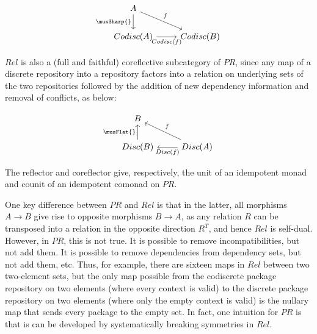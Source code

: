 \documentclass[hoptionsi,review,screen,format=sigconf]{acmart}
\theoremstyle{definition}
\newcommand{\PRb}{\mathit{PR}}
\newcommand{\Relb}{\mathit{Rel}}
\begin{document}
\begin{equation*}
\begin{tikzcd}
A \arrow[rd, "f"] \arrow[d,"\musSharp{}"']      &           \\
Codisc(A) \arrow[r, "Codisc(f)"'] & Codisc(B)
\end{tikzcd}
\end{equation*}

 \(\Relb\) is also a (full and faithful) coreflective subcategory of \(\PRb\), since any map of a discrete repository into a repository factors into a relation on underlying sets of the two repositories followed by the addition of new dependency information and removal of conflicts, as below:
 
\begin{equation*}
\begin{tikzcd}
B                              &                                               \\
Disc(B) \arrow[u,"\musFlat{}"] & Disc(A) \arrow[lu, "f"'] \arrow[l, "Disc(f)"]
\end{tikzcd}
\end{equation*}

The reflector \musSharp{} and coreflector \musFlat{} give, respectively, the unit of an idempotent monad and counit of an idempotent comonad on \(\PRb\).
 
 

 
 
 
 
One key difference between \(\PRb\) and \(\Relb\) is that in the latter, all morphisms \(A \to B\) give rise to opposite morphisms \(B \to A\), as any relation \(R\) can be transposed into a relation in the opposite direction \(R^T\), and hence \(\Relb\) is self-dual. However, in \(\PRb\), this is not true. It is possible to remove incompatibilities, but not add them. It is possible to remove dependencies from dependency sets, but not add them, etc. Thus, for example, there are sixteen maps in \(\Relb\) between two two-element sets, but the only map possible from the codiscrete package repository on two elements (where every context is valid) to the discrete package repository on two elements (where only the empty context is valid) is the nullary map that sends every package to the empty set. In fact, one intuition for \(\PRb\) is that is can be developed by systematically breaking symmetries in \(\Relb\).
\end{document}
